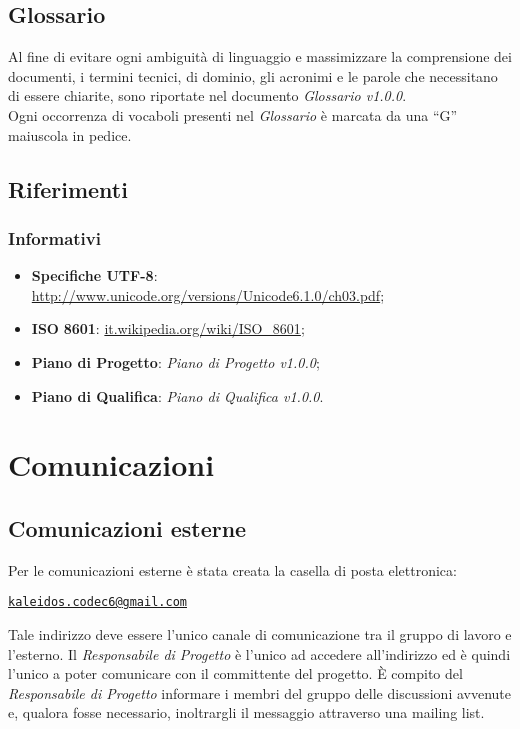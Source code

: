 \documentclass[a4paper]{report}
\newcommand{\mail}[1]{\href{mailto:#1}{\texttt{#1}}}	%
\newcommand{\mychapter}[2]{
	\setcounter{chapter}{#1}
	\setcounter{section}{0}
	\setcounter{subsection}{1}
	\chapter*{#2}
	\addcontentsline{toc}{chapter}{#2}
}
\begin{document}
	\section{Glossario}
		Al fine di evitare ogni ambiguità di linguaggio e massimizzare la
		comprensione dei documenti, i termini tecnici, di dominio, gli
		acronimi e le parole che necessitano di essere chiarite, sono
		riportate nel documento \textit{Glossario v1.0.0}.\\
		Ogni occorrenza di vocaboli presenti nel \textit{Glossario} è
		marcata da una ``G'' maiuscola in pedice.
	\section{Riferimenti}
		\subsection{Informativi}	
			\begin{itemize}
			\item\textbf{Specifiche UTF-8}:\\
			\url{http://www.unicode.org/versions/Unicode6.1.0/ch03.pdf};
			\item\textbf{ISO} \textbf{8601}:
			\url{it.wikipedia.org/wiki/ISO_8601};
			\item\textbf{Piano di Progetto}: \textit{Piano di Progetto
			v1.0.0};
			\item\textbf{Piano di Qualifica}: \textit{Piano di Qualifica
			v1.0.0}.
			\end{itemize}
	
	\mychapter{2}{Comunicazioni}
	\section{Comunicazioni esterne}
		Per le comunicazioni esterne è stata creata la casella di posta
		elettronica:
		\begin{center}
		\mail{kaleidos.codec6@gmail.com}
		\end{center}
		Tale indirizzo deve essere l'unico canale di comunicazione tra il
		gruppo di lavoro e l'esterno.
		Il \textit{Responsabile di Progetto} è l'unico ad accedere
		all'indirizzo ed è quindi l'unico a poter comunicare con il
		committente del progetto. È compito del \textit{Responsabile di
		Progetto} informare i membri del gruppo delle discussioni avvenute e,
		qualora fosse necessario, inoltrargli il messaggio attraverso
		una mailing list.
\end{document}
